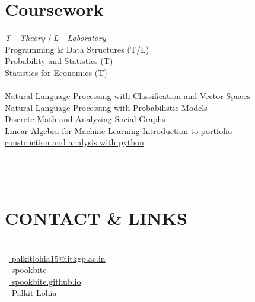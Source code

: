 \documentclass[]{deedy-resume-openfont}
\begin{document}
\begin{minipage}[t]{0.33\textwidth}
\section{Coursework}
\emph{T - Theory | L - Laboratory}\\
Programming \& Data Structures (T/L)\\
Probability and Statistics (T)\\
Statistics for Economics (T)\\
\sectionsep
{}\\
\href{https://coursera.org/share/9a2868c911ab931492ad1bfc84b3ac75}{Natural Language Processing with Classification and Vector Spaces}\\
\href{https://coursera.org/share/b77c1d962643f8fa066ca076c3f3be10}{Natural Language Processing with Probabilistic Models}\\
\href{https://coursera.org/share/85611fef8e8312607c95a49a5a63fc87}{Discrete Math and Analyzing Social Graphs}\\
\href{https://coursera.org/share/b76987bf1b6c78e3745c91ced9492502}{Linear Algebra for Machine Learning}
\href{https://coursera.org/share/7446c90cce3eeb7deb317fd868c0fa4f}{Introduction to portfolio\\ construction and analysis with python}\\


\\~\\~\\

\section{CONTACT \& LINKS} 
\\
\faEnvelope\ {\href{mailto:palkitlohia15@iitkgp.ac.in}{ palkitlohia15@iitkgp.ac.in}}\\
\faGithub\ {\href{https://github.com/spookbite}{ spookbite}}\\
\faGlobe\ {\href{https://spookbite.github.io/}{ spookbite.github.io}}\\
\faLinkedinSquare\ {\href{https://www.linkedin.com/in/palkit-l-49aa66195/}{ Palkit Lohia}}\\
\\
\sectionsep
 \\~\\
 
%
%

\end{minipage} 
\end{document}

